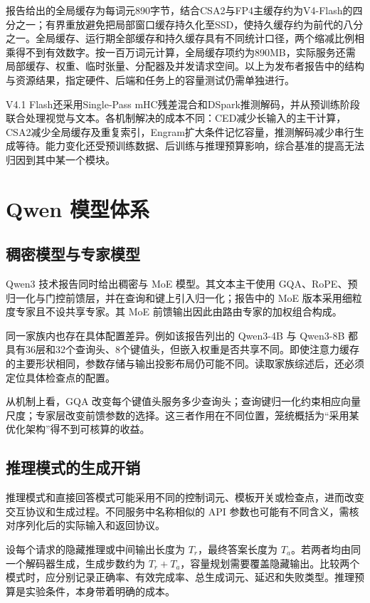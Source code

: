 \documentclass[../textbook.tex]{subfiles}
\begin{document}
报告给出的全局缓存为每词元890字节，结合CSA2与FP4主缓存约为V4-Flash的四分之一；有界重放避免把局部窗口缓存持久化至SSD，使持久缓存约为前代的八分之一。全局缓存、运行期全部缓存和持久缓存具有不同统计口径，两个缩减比例相乘得不到有效数字。按一百万词元计算，全局缓存项约为890MB，实际服务还需局部缓存、权重、临时张量、分配器及并发请求空间。以上为发布者报告中的结构与资源结果，指定硬件、后端和任务上的容量测试仍需单独进行。

V4.1 Flash还采用Single-Pass mHC残差混合和DSpark推测解码，并从预训练阶段联合处理视觉与文本。各机制解决的成本不同：CED减少长输入的主干计算，CSA2减少全局缓存及重复索引，Engram扩大条件记忆容量，推测解码减少串行生成等待。能力变化还受预训练数据、后训练与推理预算影响，综合基准的提高无法归因到其中某一个模块。

\section{Qwen 模型体系}

\subsection{稠密模型与专家模型}
Qwen3 技术报告同时给出稠密与 MoE 模型。其文本主干使用 GQA、RoPE、预归一化与门控前馈层，并在查询和键上引入归一化；报告中的 MoE 版本采用细粒度专家且不设共享专家\cite{qwen2025qwen3}。其 MoE 前馈输出因此由路由专家的加权组合构成。

同一家族内也存在具体配置差异。例如该报告列出的 Qwen3-4B 与 Qwen3-8B 都具有36层和32个查询头、8个键值头，但嵌入权重是否共享不同。即使注意力缓存的主要形状相同，参数存储与输出投影布局仍可能不同。读取家族综述后，还必须定位具体检查点的配置。

从机制上看，GQA 改变每个键值头服务多少查询头；查询键归一化约束相应向量尺度；专家层改变前馈参数的选择。这三者作用在不同位置，笼统概括为“采用某优化架构”得不到可核算的收益。

\subsection{推理模式的生成开销}
推理模式和直接回答模式可能采用不同的控制词元、模板开关或检查点，进而改变交互协议和生成过程。不同服务中名称相似的 API 参数也可能有不同含义，需核对序列化后的实际输入和返回协议。

设每个请求的隐藏推理或中间输出长度为 $T_r$，最终答案长度为 $T_a$。若两者均由同一个解码器生成，生成步数约为 $T_r+T_a$，容量规划需要覆盖隐藏输出。比较两个模式时，应分别记录正确率、有效完成率、总生成词元、延迟和失败类型。推理预算是实验条件，本身带着明确的成本。
\end{document}
